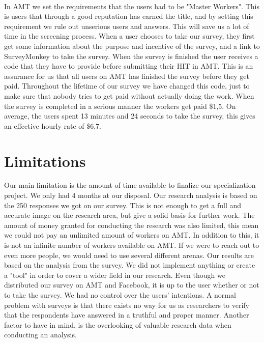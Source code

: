 \paragraph{}
In AMT we set the requirements that the users had to be "Master Workers". This is users that through a good reputation has earned the title, and by setting this requirement we rule out unserious users and answers. This will save us a lot of time in the screening process. When a user chooses to take our survey, they first get some information about the purpose and incentive of the survey, and a link to SurveyMonkey to take the survey. When the survey is finished the user receives a code that they have to provide before submitting their HIT in AMT. This is an assurance for us that all users on AMT has finished the survey before they get paid. Throughout the lifetime of our survey we have changed this code, just to make sure that nobody tries to get paid without actually doing the work. When the survey is completed in a serious manner the workers get paid \$1,5. On average, the users spent 13 minutes and 24 seconds to take the survey, this gives an effective hourly rate of \$6,7. 

\section{Limitations} 
Our main limitation is the amount of time available to finalize our specialization project. We only had 4 months at our disposal. Our research analysis is based on the 250 responses we got on our survey. This is not enough to get a full and accurate image on the research area, but give a solid basis for further work. The amount of money granted for conducting the research was also limited, this mean we could not pay an unlimited amount of workers on AMT. In addition to this, it is not an infinite number of workers available on AMT. If we were to reach out to even more people, we would need to use several different arenas. Our results are based on the analysis from the survey. We did not implement anything or create a "tool" in order to cover a wider field in our research. Even though we distributed our survey on AMT and Facebook, it is up to the user whether or not to take the survey. We had no control over the users' intentions. A normal problem with surveys is that there exists no way for us as researchers to verify that the respondents have answered in a truthful and proper manner. Another factor to have in mind, is the overlooking of valuable research data when conducting an analysis. 


